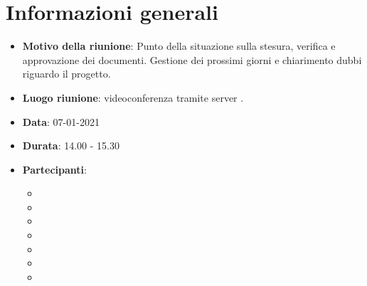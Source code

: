 \section{Informazioni generali}
\begin{itemize}
\item \textbf{Motivo della riunione}: Punto della situazione sulla stesura, verifica e approvazione dei documenti. Gestione dei prossimi giorni e chiarimento dubbi riguardo il progetto.
\item \textbf{Luogo riunione}: videoconferenza tramite server .
\item \textbf{Data}: 07-01-2021
\item \textbf{Durata}: 14.00 - 15.30
\item \textbf{Partecipanti}:
	\begin{itemize}
	\item \BM{}
	\item \SG{}
	\item \SP{}
	\item \SH{}
	\item \PA{}
	\item \ZM{}
	\item \RA{}
	\end{itemize}
\end{itemize}

\newpage
